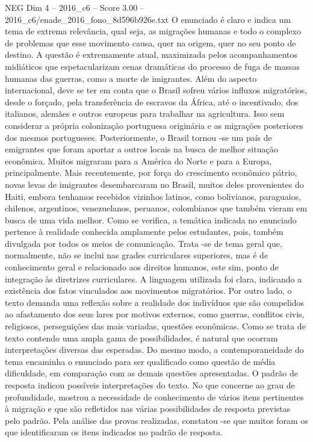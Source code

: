 \begin{textsample}{NEG Dim 4 – 2016\_c6 – Score 3.00 – 2016\_c6/enade\_2016\_fono\_8d596b926e.txt}
O enunciado é claro e indica um tema de extrema relevância, qual seja, as migrações humanas e todo o complexo de problemas que esse movimento causa, quer na origem, quer no seu ponto de destino.
A questão é extremamente atual, maximizada pelos acompanhamentos midiáticos que espetacularizam cenas dramáticas do processo de fuga de massas humanas das guerras, como a morte de imigrantes.
Além do aspecto internacional, deve se ter em conta que o Brasil sofreu vários influxos migratórios, desde o forçado, pela transferência de escravos da África, até o incentivado, dos italianos, alemães e outros europeus para trabalhar na agricultura.
Isso sem considerar a própria colonização portuguesa originária e as migrações posteriores dos mesmos portugueses.
Posteriormente, o Brasil tornou -se um país de emigrantes que foram aportar a outros locais na busca de melhor situação econômica.
Muitos migraram para a América do Norte e para a Europa, principalmente.
Mais recentemente, por força do crescimento econômico pátrio, novas levas de imigrantes desembarcaram no Brasil, muitos deles provenientes do Haiti, embora tenhamos recebidos vizinhos latinos, como bolivianos, paraguaios, chilenos, argentinos, venezuelanos, peruanos, colombianos que também vieram em busca de uma vida melhor.
Como se verifica, a temática indicada no enunciado pertence à realidade conhecida amplamente pelos estudantes, pois, também divulgada por todos os meios de comunicação.
Trata -se de tema geral que, normalmente, não se inclui nas grades curriculares superiores, mas é de conhecimento geral e relacionado aos direitos humanos, este sim, ponto de integração às diretrizes curriculares.
A linguagem utilizada foi clara, indicando a existência dos fatos vinculados aos movimentos migratórios.
Por outro lado, o texto demanda uma reflexão sobre a realidade dos indivíduos que são compelidos ao afastamento dos seus lares por motivos externos, como guerras, conflitos civis, religiosos, perseguições das mais variadas, questões econômicas.
Como se trata de texto contendo uma ampla gama de possibilidades, é natural que ocorram interpretações diversas das esperadas.
Do mesmo modo, a contemporaneidade do tema encaminha o enunciado para ser qualificado como questão de média dificuldade, em comparação com as demais questões apresentadas.
O padrão de resposta indicou possíveis interpretações do texto.
No que concerne ao grau de profundidade, mostrou a necessidade de conhecimento de vários itens pertinentes à migração e que são refletidos nas várias possibilidades de resposta previstas pelo padrão.
Pela análise das provas realizadas, constatou -se que muitos foram os que identificaram os itens indicados no padrão de resposta.

\end{textsample}

